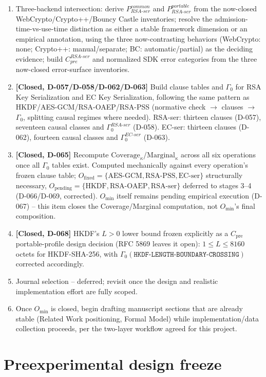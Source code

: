 \documentclass[11pt,a4paper]{article}
\begin{document}
\begin{enumerate}
\item Three-backend intersection: derive $P_{RSA\text{-}ser}^{common}$ and $P_{RSA\text{-}ser}^{portable}$ from the now-closed WebCrypto/Crypto++/Bouncy Castle inventories; resolve the admission-time-vs-use-time distinction as either a stable framework dimension or an empirical annotation, using the three now-contrasting behaviors (WebCrypto: none; Crypto++: manual/separate; BC: automatic/partial) as the deciding evidence; build $C_{pre}^{RSA\text{-}ser}$ and normalized SDK error categories from the three now-closed error-surface inventories.
\item \textbf{[Closed, D-057/D-058/D-062/D-063]} Build clause tables and $\Gamma_0$ for RSA Key Serialization and EC Key Serialization, following the same pattern as HKDF/AES-GCM/RSA-OAEP/RSA-PSS (normative check $\to$ clauses $\to$ $\Gamma_0$, splitting causal regimes where needed). RSA-ser: thirteen clauses (D-057), seventeen causal classes and $\Gamma_0^{RSA\text{-}ser}$ (D-058). EC-ser: thirteen clauses (D-062), fourteen causal classes and $\Gamma_0^{EC\text{-}ser}$ (D-063).
\item \textbf{[Closed, D-065]} Recompute $\text{Coverage}_\kappa$/$\text{Marginal}_\kappa$ across all six operations once all $\Gamma_0$ tables exist. Computed mechanically against every operation's frozen clause table; $O_{\text{fixed}}=\{\text{AES-GCM},\text{RSA-PSS},\text{EC-ser}\}$ structurally necessary, $O_{\text{pending}}=\{\text{HKDF},\text{RSA-OAEP},\text{RSA-ser}\}$ deferred to stages 3--4 (D-066/D-069, corrected). $O_{\min}$ itself remains pending empirical execution (D-067) -- this item closes the Coverage/Marginal computation, not $O_{\min}$'s final composition.
\item \textbf{[Closed, D-068]} HKDF's $L>0$ lower bound frozen explicitly as a $C_{\text{pre}}$ portable-profile design decision (RFC 5869 leaves it open): $1\le L\le 8160$ octets for HKDF-SHA-256, with $\Gamma_0(\texttt{HKDF-LENGTH-BOUNDARY-CROSSING})$ corrected accordingly.
\item Journal selection -- deferred; revisit once the design and realistic implementation effort are fully scoped.
\item Once $O_{\min}$ is closed, begin drafting manuscript sections that are already stable (Related Work positioning, Formal Model) while implementation/data collection proceeds, per the two-layer workflow agreed for this project.
\end{enumerate}

\section{Preexperimental design freeze}\label{sec:freeze}
\end{document}
